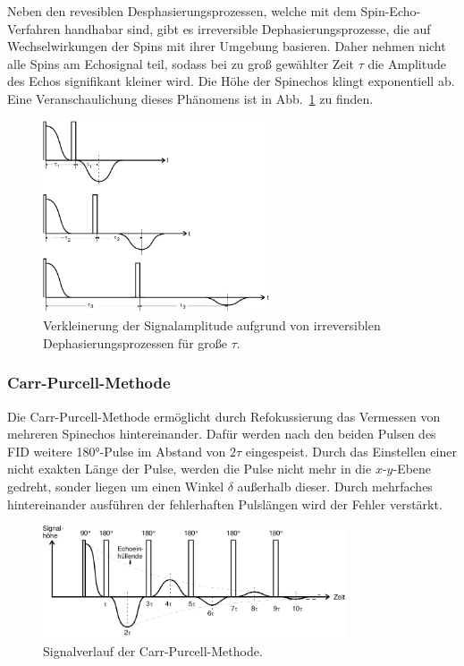 Neben den revesiblen Desphasierungsprozessen, welche mit dem Spin-Echo-Verfahren
handhabar sind, gibt es irreversible Dephasierungsprozesse, die auf Wechselwirkungen
der Spins mit ihrer Umgebung basieren.
Daher nehmen nicht alle Spins am Echosignal teil, sodass bei zu groß gewählter Zeit $\tau$
die Amplitude des Echos signifikant kleiner wird.
Die Höhe der Spinechos klingt exponentiell ab.
Eine Veranschaulichung dieses Phänomens ist in Abb.~\ref{fig:dephase}
zu finden.
\begin{figure}[h]
  \centering
  \includegraphics[width = 0.6\textwidth]{Pics/echo.pdf}
  \caption{Verkleinerung der Signalamplitude aufgrund von irreversiblen Dephasierungsprozessen
  für große $\tau$\cite{anleitung}.}
  \label{fig:dephase}
\end{figure}

\subsubsection{Carr-Purcell-Methode}
Die Carr-Purcell-Methode ermöglicht durch Refokussierung das Vermessen von mehreren Spinechos
hintereinander. Dafür werden nach den beiden Pulsen des FID weitere 180°-Pulse
im Abstand von $2\tau$ eingespeist. Durch das Einstellen einer nicht exakten Länge
der Pulse, werden die Pulse nicht mehr in die $x$-$y$-Ebene gedreht, sonder
liegen um einen Winkel $\delta$ außerhalb dieser.
Durch mehrfaches hintereinander ausführen der fehlerhaften Pulslängen wird
der Fehler verstärkt.

\begin{figure}
  \centering
  \includegraphics[width = 0.8\textwidth]{Pics/carr_purcell.pdf}
  \caption{Signalverlauf der Carr-Purcell-Methode\cite{anleitung}.}
  \label{eqn:carr_purcell}
\end{figure}

